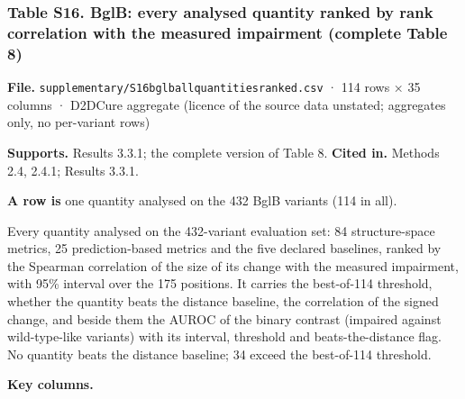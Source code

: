 \documentclass[
  10pt,
]{article}
\DeclareRobustCommand{\_}{\textunderscore\hspace{0pt}}
\begin{document}
\hypertarget{S16}{%
\subsubsection{Table
S16. BglB: every
analysed quantity
ranked by rank
correlation with the
measured impairment
(complete Table
8)}\label{S16}}

\begin{shaded}\small

\textbf{File.}
\texttt{supplementary/S16\_bglb\_all\_quantities\_ranked.csv}
· 114 rows × 35
columns · D2DCure
aggregate (licence
of the source data
unstated; aggregates
only, no per-variant
rows)

\textbf{Supports.}
Results 3.3.1; the
complete version of
Table 8.
\textbf{Cited in.}
Methods 2.4, 2.4.1;
Results 3.3.1.

\textbf{A row is}
one quantity
analysed on the 432
BglB variants (114
in all).

\end{shaded}

Every quantity
analysed on the
432-variant
evaluation set: 84
structure-space
metrics, 25
prediction-based
metrics and the five
declared baselines,
ranked by the
Spearman correlation
of the size of its
change with the
measured impairment,
with 95\% interval
over the 175
positions. It
carries the
best-of-114
threshold, whether
the quantity beats
the distance
baseline, the
correlation of the
signed change, and
beside them the
AUROC of the binary
contrast (impaired
against
wild-type-like
variants) with its
interval, threshold
and
beats-the-distance
flag. No quantity
beats the distance
baseline; 34 exceed
the best-of-114
threshold.

\textbf{Key
columns.}
\end{document}
